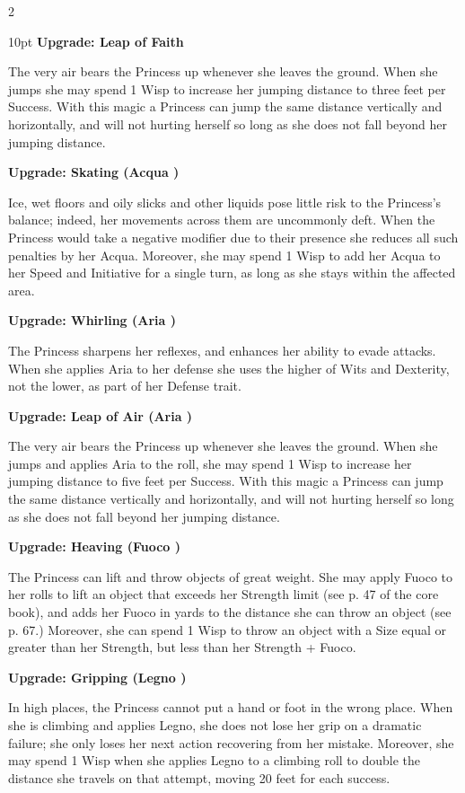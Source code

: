 \begin{multicols}{2}
\begin{myindentpar}{10pt}
\textbf{Upgrade: Leap of Faith}

The very air bears the Princess up whenever she leaves the ground. When she jumps she may spend 1 Wisp to increase her jumping distance to three feet per Success. With this magic a Princess can jump the same distance vertically and horizontally, and will not hurting herself so long as she does not fall beyond her jumping distance. 

\textbf{Upgrade: Skating (Acqua \textbullet)}

Ice, wet floors and oily slicks and other liquids pose little risk to the Princess's balance; indeed, her movements across them are uncommonly deft. When the Princess would take a negative modifier due to their presence she reduces all such penalties by her Acqua. Moreover, she may spend 1 Wisp to add her Acqua to her Speed and Initiative for a single turn, as long as she stays within the affected area.

\textbf{Upgrade: Whirling (Aria \textbullet)}

The Princess sharpens her reflexes, and enhances her ability to evade attacks. When she applies Aria to her defense she uses the higher of Wits and Dexterity, not the lower, as part of her Defense trait. 

\textbf{Upgrade: Leap of Air (Aria \textbullet\textbullet)}

The very air bears the Princess up whenever she leaves the ground. When she jumps and applies Aria to the roll, she may spend 1 Wisp to increase her jumping distance to five feet per Success. With this magic a Princess can jump the same distance vertically and horizontally, and will not hurting herself so long as she does not fall beyond her jumping distance.  

\textbf{Upgrade: Heaving (Fuoco \textbullet\textbullet)}

The Princess can lift and throw objects of great weight. She may apply Fuoco to her rolls to lift an object that exceeds her Strength limit (see p. 47 of the core book), and adds her Fuoco in yards to the distance she can throw an object (see p. 67.) Moreover, she can spend 1 Wisp to throw an object with a Size equal or greater than her Strength, but less than her Strength + Fuoco.

\textbf{Upgrade: Gripping (Legno \textbullet\textbullet)}

In high places, the Princess cannot put a hand or foot in the wrong place. When she is climbing and applies Legno, she does not lose her grip on a dramatic failure; she only loses her next action recovering from her mistake. Moreover, she may spend 1 Wisp when she applies Legno to a climbing roll to double the distance she travels on that attempt, moving 20 feet for each success.\end{myindentpar}


\end{multicols}
